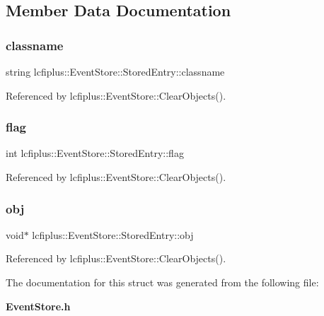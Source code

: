 \subsection{Member Data Documentation}
\mbox{\label{structlcfiplus_1_1EventStore_1_1StoredEntry_ac77dec9a4b4f6af998370ac130707d9a}} 
\subsubsection{classname}
{\footnotesize\ttfamily string lcfiplus\+::\+Event\+Store\+::\+Stored\+Entry\+::classname}



Referenced by lcfiplus\+::\+Event\+Store\+::\+Clear\+Objects().

\mbox{\label{structlcfiplus_1_1EventStore_1_1StoredEntry_ac4d939f4f3ffdbf38e2859766b01524d}} 
\subsubsection{flag}
{\footnotesize\ttfamily int lcfiplus\+::\+Event\+Store\+::\+Stored\+Entry\+::flag}



Referenced by lcfiplus\+::\+Event\+Store\+::\+Clear\+Objects().

\mbox{\label{structlcfiplus_1_1EventStore_1_1StoredEntry_a538fa2e380be618431ba8096e26940b1}} 
\subsubsection{obj}
{\footnotesize\ttfamily void$\ast$ lcfiplus\+::\+Event\+Store\+::\+Stored\+Entry\+::obj}



Referenced by lcfiplus\+::\+Event\+Store\+::\+Clear\+Objects().



The documentation for this struct was generated from the following file\+:\begin{DoxyCompactItemize}
\item 
\textbf{ Event\+Store.\+h}\end{DoxyCompactItemize}
